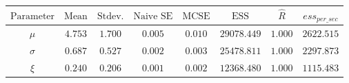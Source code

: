 \begin{tabular}{cccccccc}
\toprule
$\textrm{Parameter}$ & $\textrm{Mean}$ & $\textrm{Stdev.}$ & $\textrm{Naive SE}$ & $\textrm{MCSE}$ & $\textrm{ESS}$ & $\hat{R}$ & $ess_{per\_sec}$\\
\midrule
$\mu$ & $4.753$ & $1.700$ & $0.005$ & $0.010$ & $29078.449$ & $1.000$ & $2622.515$\\
$\sigma$ & $0.687$ & $0.527$ & $0.002$ & $0.003$ & $25478.811$ & $1.000$ & $2297.873$\\
$\xi$ & $0.240$ & $0.206$ & $0.001$ & $0.002$ & $12368.480$ & $1.000$ & $1115.483$\\
\bottomrule
\end{tabular}
